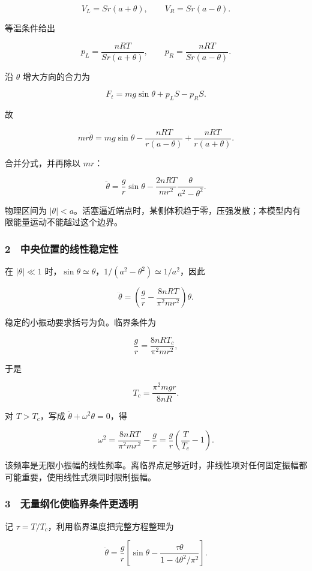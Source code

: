 \documentclass[12pt,a4paper,fontset=fandol]{ctexart}
\begin{document}
\[V_L=Sr(a+\theta),\qquad V_R=Sr(a-\theta).\]

等温条件给出

\[p_L=\frac{nRT}{Sr(a+\theta)},\qquad
p_R=\frac{nRT}{Sr(a-\theta)}.\]

沿 \(\theta\) 增大方向的合力为

\[F_t=mg\sin\theta+p_LS-p_RS.\]

故

\[mr\ddot\theta=mg\sin\theta
-\frac{nRT}{r(a-\theta)}+\frac{nRT}{r(a+\theta)}.\]

合并分式，并再除以 \(mr\)：

\[\boxed{\ddot\theta=\frac gr\sin\theta
-\frac{2nRT}{mr^2}\frac\theta{a^2-\theta^2}.}\]

物理区间为
\(|\theta|<a\)。活塞逼近端点时，某侧体积趋于零，压强发散；本模型内有限能量运动不能越过这个边界。

\subsubsection{2　中央位置的线性稳定性}\label{ux4e2dux592eux4f4dux7f6eux7684ux7ebfux6027ux7a33ux5b9aux6027}

在 \(|\theta|\ll1\)
时，\(\sin\theta\simeq\theta\)，\(1/(a^2-\theta^2)\simeq1/a^2\)，因此

\[\ddot\theta=\left(\frac gr-\frac{8nRT}{\pi^2mr^2}\right)\theta.\]

稳定的小振动要求括号为负。临界条件为

\[\frac gr=\frac{8nRT_c}{\pi^2mr^2},\]

于是

\[\boxed{T_c=\frac{\pi^2mgr}{8nR}.}\]

对 \(T>T_c\)，写成 \(\ddot\theta+\omega^2\theta=0\)，得

\[\boxed{\omega^2=\frac{8nRT}{\pi^2mr^2}-\frac gr
=\frac gr\left(\frac T{T_c}-1\right).}\]

该频率是无限小振幅的线性频率。离临界点足够近时，非线性项对任何固定振幅都可能重要，使用线性式须同时限制振幅。

\subsubsection{3　无量纲化使临界条件更透明}\label{ux65e0ux91cfux7eb2ux5316ux4f7fux4e34ux754cux6761ux4ef6ux66f4ux900fux660e}

记 \(\tau=T/T_c\)，利用临界温度把完整方程整理为

\[\boxed{\ddot\theta=\frac gr
\left[\sin\theta-\frac{\tau\theta}{1-4\theta^2/\pi^2}\right].}\]
\end{document}
